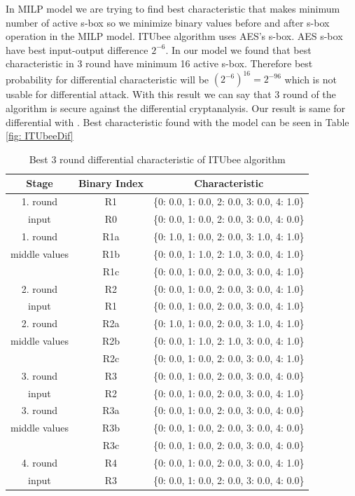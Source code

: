 In MILP model we are trying to find best characteristic that makes minimum number of active s-box so we minimize binary values before and after s-box operation in the MILP model. ITUbee algorithm uses AES's \cite{dworkin2001advanced} s-box. AES s-box have best input-output difference $2^{-6}$. In our model we found that best characteristic in 3 round have minimum 16 active s-box. Therefore best probability for differential characteristic will be $(2^{-6})^{16}= 2^{-96}  $ which is not usable for differential attack. With this result we can say that 3 round of the algorithm is secure against the differential cryptanalysis. Our result is same for differential with \cite{karakocc2013itubee}. Best characteristic found with the model can be seen in Table \ref{fig: ITUbeeDif}

\begin{table}[H]
\caption{Best 3 round differential characteristic of ITUbee algorithm}
    \centering
    \begin{tabular}{|c|c|c|}
        \hhline{|=|=|=|}
        \textbf{Stage} & \textbf{Binary Index} & \textbf{Characteristic} \\
        \hline
        1. round  & R1 & \{0: 0.0, 1: 0.0, 2: 0.0, 3: 0.0, 4: 1.0\} \\
        input      & R0 & \{0: 0.0, 1: 0.0, 2: 0.0, 3: 0.0, 4: 0.0\} \\
        \hline
        1. round  & R1a & \{0: 1.0, 1: 0.0, 2: 0.0, 3: 1.0, 4: 1.0\} \\
        middle values   & R1b & \{0: 0.0, 1: 1.0, 2: 1.0, 3: 0.0, 4: 1.0\} \\
                   & R1c & \{0: 0.0, 1: 0.0, 2: 0.0, 3: 0.0, 4: 1.0\} \\
        \hline
        2. round& R2 & \{0: 0.0, 1: 0.0, 2: 0.0, 3: 0.0, 4: 1.0\} \\
        input      & R1 & \{0: 0.0, 1: 0.0, 2: 0.0, 3: 0.0, 4: 1.0\} \\
        \hline
        2. round & R2a & \{0: 1.0, 1: 0.0, 2: 0.0, 3: 1.0, 4: 1.0\} \\
        middle values  & R2b & \{0: 0.0, 1: 1.0, 2: 1.0, 3: 0.0, 4: 1.0\} \\
                   & R2c & \{0: 0.0, 1: 0.0, 2: 0.0, 3: 0.0, 4: 1.0\} \\
        \hline
        3. round  & R3 & \{0: 0.0, 1: 0.0, 2: 0.0, 3: 0.0, 4: 0.0\} \\
        input     & R2 & \{0: 0.0, 1: 0.0, 2: 0.0, 3: 0.0, 4: 1.0\} \\
        \hline
        3. round  & R3a & \{0: 0.0, 1: 0.0, 2: 0.0, 3: 0.0, 4: 0.0\} \\
        middle values   & R3b & \{0: 0.0, 1: 0.0, 2: 0.0, 3: 0.0, 4: 0.0\} \\
                   & R3c & \{0: 0.0, 1: 0.0, 2: 0.0, 3: 0.0, 4: 0.0\} \\
        \hline
        4. round & R4 & \{0: 0.0, 1: 0.0, 2: 0.0, 3: 0.0, 4: 1.0\} \\
        input    & R3 & \{0: 0.0, 1: 0.0, 2: 0.0, 3: 0.0, 4: 0.0\} \\
        \hline
    \end{tabular}
    

\end{table}
